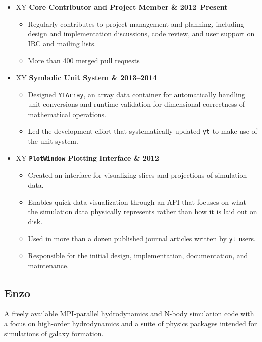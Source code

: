 \documentclass[10pt,letterpaper]{article}
\newcommand{\textline}[2]{
  \begin{tabularx}{\textwidth}{XY}
  #1 & #2
  \end{tabularx}
}
\begin{document}
\begin{itemize}

\item[] \textline{\bf Core Contributor and Project Member}{2012--Present}
  \begin{itemize}
    \item Regularly contributes to project management and planning, including
      design and implementation discussions, code review, and user support on
      IRC and mailing lists.
    \item More than 400 merged pull requests
  \end{itemize}

\item[] \textline{\bf Symbolic Unit System}{2013--2014}
  \begin{itemize}
    \item Designed \texttt{YTArray}, an array data container for automatically
      handling unit conversions and runtime validation for dimensional correctness
      of mathematical operations.
    \item Led the development effort that systematically updated \texttt{yt} to
      make use of the unit system.
  \end{itemize}

\item[] \textline{\bf \texttt{PlotWindow} Plotting Interface}{2012}
  \begin{itemize}
    \item Created an interface for visualizing slices and projections of
      simulation data.
    \item Enables quick data visualization through an API that focuses on what
      the simulation data physically represents rather than how it is laid out
      on disk.
    \item Used in more than a dozen published journal articles written by
      \texttt{yt} users.
    \item Responsible for the initial design, implementation, documentation, and maintenance.
  \end{itemize}

\end{itemize}

\subsection*{Enzo}

A freely available MPI-parallel hydrodynamics and N-body simulation code with a
focus on high-order hydrodynamics and a suite of physics packages intended for
simulations of galaxy formation.
\end{document}
